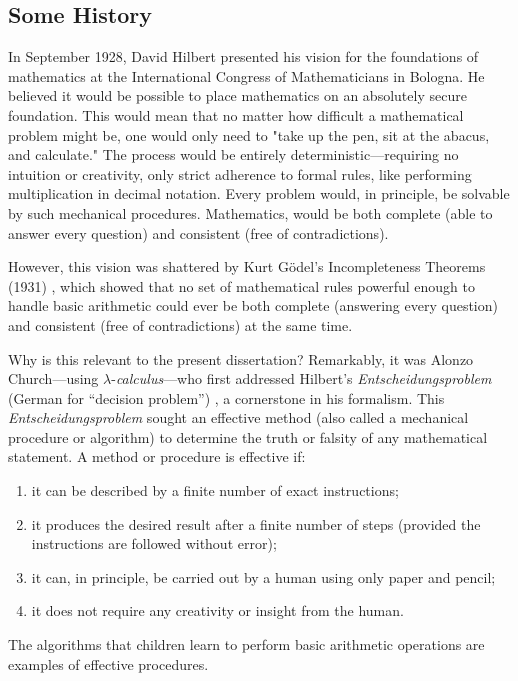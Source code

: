 \subsection*{Some History}

In September 1928, David Hilbert presented his vision for the foundations of mathematics at the International Congress of Mathematicians in Bologna. He believed it would be possible to place mathematics on an absolutely secure foundation. This would mean that no matter how difficult a mathematical problem might be, one would only need to "take up the pen, sit at the abacus, and calculate." The process would be entirely deterministic—requiring no intuition or creativity, only strict adherence to formal rules, like performing multiplication in decimal notation. Every problem would, in principle, be solvable by such mechanical procedures. Mathematics, would be both complete (able to answer every question) and consistent (free of contradictions). 

However, this vision was shattered by Kurt Gödel’s Incompleteness Theorems (1931) \cite{Godel}, which showed that no set of mathematical rules powerful enough to handle basic arithmetic could ever be both complete (answering every question) and consistent (free of contradictions) at the same time.


Why is this relevant to the present dissertation? Remarkably, it was Alonzo Church—using $\lambda$-\textit{calculus}—who first addressed Hilbert’s \emph{Entscheidungsproblem} (German for ``decision problem'') \cite{hilbert1938}, a cornerstone in his formalism. This \emph{Entscheidungsproblem} sought an effective method (also called a mechanical procedure or algorithm) to determine the truth or falsity of any mathematical statement. A method or procedure is effective if:
\begin{enumerate}
    \item it can be described by a finite number of exact instructions;
    \item it produces the desired result after a finite number of steps (provided the instructions are followed without error);
    \item it can, in principle, be carried out by a human using only paper and pencil;
    \item it does not require any creativity or insight from the human.
\end{enumerate}
The algorithms that children learn to perform basic arithmetic operations are examples of effective procedures.

